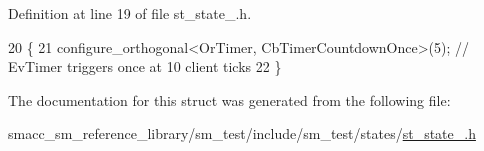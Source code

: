 Definition at line 19 of file st\+\_\+state\+\_.\+h.


\begin{DoxyCode}
20     \{
21         configure\_orthogonal<OrTimer, CbTimerCountdownOnce>(5); \textcolor{comment}{// EvTimer triggers once at 10 client ticks}
22     \}
\end{DoxyCode}


The documentation for this struct was generated from the following file\+:\begin{DoxyCompactItemize}
\item 
smacc\+\_\+sm\+\_\+reference\+\_\+library/sm\+\_\+test/include/sm\+\_\+test/states/\hyperlink{sm__test_2include_2sm__test_2states_2st__state__2_8h}{st\+\_\+state\+\_.\+h}\end{DoxyCompactItemize}
